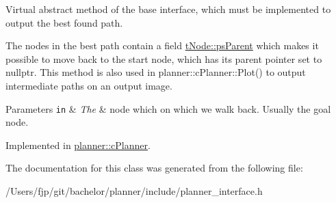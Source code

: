 Virtual abstract method of the base interface, which must be implemented to output the best found path. 

The nodes in the best path contain a field \mbox{\hyperlink{structplanner_1_1t_node_aa0d83ee95132d2d2af6a794189411fab}{t\+Node\+::ps\+Parent}} which makes it possible to move back to the start node, which has its parent pointer set to nullptr. This method is also used in planner\+::c\+Planner\+::\+Plot() to output intermediate paths on an output image. 
\begin{DoxyParams}[1]{Parameters}
\mbox{\tt in}  & {\em The} & node which on which we walk back. Usually the goal node. \\
\hline
\end{DoxyParams}


Implemented in \mbox{\hyperlink{classplanner_1_1c_planner_ad9389067cbc3fa6fb1c2efdf3f344664}{planner\+::c\+Planner}}.



The documentation for this class was generated from the following file\+:\begin{DoxyCompactItemize}
\item 
/\+Users/fjp/git/bachelor/planner/include/planner\+\_\+interface.\+h\end{DoxyCompactItemize}
